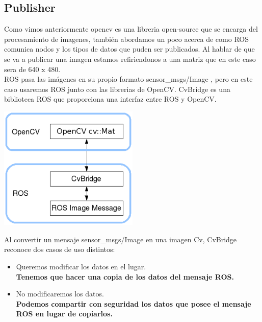 \subsection{Publisher}
Como vimos anteriormente opencv es una libreria open-source que se encarga del procesamiento
de imagenes, también abordamos un poco acerca de como ROS comunica nodos y los 
tipos de datos que puden ser publicados. Al hablar de que se va a publicar una imagen
estamos refiriendonos a una matriz que en este caso sera de 640 x 480.\\
ROS pasa las imágenes en su propio formato sensor\_msgs/Image , pero
en este caso usaremos ROS junto con las librerias de  OpenCV. CvBridge es una 
biblioteca ROS que proporciona una interfaz entre ROS y OpenCV.
\begin{center}
    \includegraphics[width=0.5\textwidth]{Capitulo4/Fig1.eps}       
    \label{Fig1}
\end{center}
Al convertir un mensaje sensor\_msgs/Image en una imagen Cv, CvBridge 
reconoce dos casos de uso distintos:
\begin{itemize}
    \item Queremos modificar los datos en el lugar.\\
    \textbf{Tenemos que hacer una copia de los datos del mensaje ROS.}
    \item No modificaremos los datos.\\
    \textbf{Podemos compartir con seguridad los datos que posee el mensaje ROS en lugar de copiarlos.}
\end{itemize}
 
